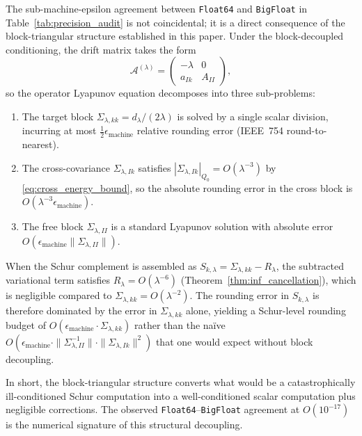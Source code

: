 \begin{remark}
\label{rmk:block_decoupling_error}
The sub-machine-epsilon agreement between \texttt{Float64} and \texttt{BigFloat} in Table~\ref{tab:precision_audit} is not coincidental; it is a direct consequence of the block-triangular structure established in this paper. Under the block-decoupled conditioning, the drift matrix takes the form
\begin{equation}
  \mathcal{A}^{(\lambda)}=\begin{pmatrix}-\lambda&0\\a_{Ik}&A_{II}\end{pmatrix},
\end{equation}
so the operator Lyapunov equation decomposes into three sub-problems:
\begin{enumerate}
  \item The target block $\Sigma_{\lambda,kk}=d_\lambda/(2\lambda)$ is solved by a single scalar division, incurring at most $\frac{1}{2}\epsilon_{\mathrm{machine}}$ relative rounding error (IEEE~754 round-to-nearest).
  \item The cross-covariance $\Sigma_{\lambda,Ik}$ satisfies $|\Sigma_{\lambda,Ik}|_{Q_0}=O(\lambda^{-3})$ by \eqref{eq:cross_energy_bound}, so the absolute rounding error in the cross block is $O(\lambda^{-3}\epsilon_{\mathrm{machine}})$.
  \item The free block $\Sigma_{\lambda,II}$ is a standard Lyapunov solution with absolute error $O(\epsilon_{\mathrm{machine}}\|\Sigma_{\lambda,II}\|)$.
\end{enumerate}
When the Schur complement is assembled as $S_{k,\lambda}=\Sigma_{\lambda,kk}-R_\lambda$, the subtracted variational term satisfies $R_\lambda=O(\lambda^{-6})$ (Theorem~\ref{thm:inf_cancellation}), which is negligible compared to $\Sigma_{\lambda,kk}=O(\lambda^{-2})$. The rounding error in $S_{k,\lambda}$ is therefore dominated by the error in $\Sigma_{\lambda,kk}$ alone, yielding a Schur-level rounding budget of $O(\epsilon_{\mathrm{machine}}\cdot\Sigma_{\lambda,kk})$ rather than the na\"ive $O(\epsilon_{\mathrm{machine}}\cdot\|\Sigma_{\lambda,II}^{-1}\|\cdot\|\Sigma_{\lambda,Ik}\|^2)$ that one would expect without block decoupling.

In short, the block-triangular structure converts what would be a catastrophically ill-conditioned Schur computation into a well-conditioned scalar computation plus negligible corrections. The observed \texttt{Float64}--\texttt{BigFloat} agreement at $O(10^{-17})$ is the numerical signature of this structural decoupling.
\end{remark}

